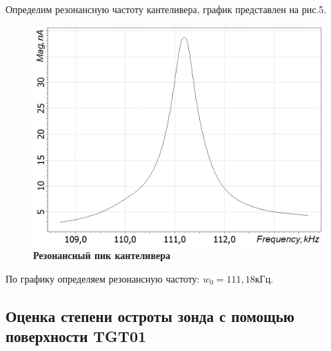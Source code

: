\documentclass[a4paper]{article}
\begin{document}
Определим резонансную частоту кантеливера, график представлен на рис.5.
 \begin{figure}[H]
\centering
	\includegraphics[width=0.8\linewidth]{curve1.jpg}
		\caption{{\bf {Резонансный пик кантеливера}}}
   	\label{fig:5}
\end{figure}
По графику определяем резонансную частоту: \textit{$w_0 = 111,18 кГц$}.

\subsection{Оценка степени остроты зонда с помощью поверхности TGT01}
\end{document}
